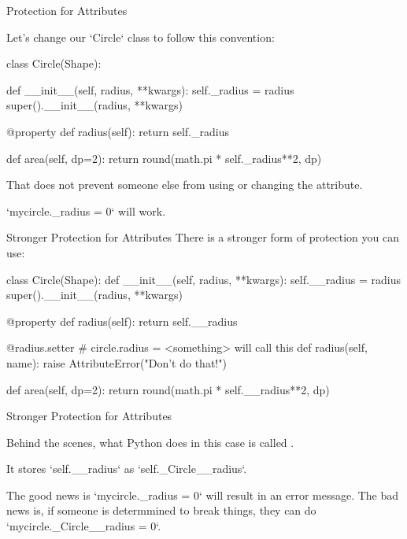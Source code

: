 \documentclass[aspectratio=149] {beamer}
\begin{document}
\begin{frame}[fragile]{Protection for Attributes}
  
   \small
  Let's change our \inline`Circle` class to follow this convention:
 
  \begin{pythoncode}
    class Circle(Shape):

        def __init__(self, radius, **kwargs):
            self._radius = radius
            super().__init__(radius, **kwargs)

        @property
        def radius(self):
            return self._radius

        def area(self, dp=2):
            return round(math.pi * self._radius**2, dp)
  \end{pythoncode}

  That does not prevent someone else from using or changing the attribute.
  
  \inline`mycircle._radius = 0` will work.
  
\end{frame}


\begin{frame}[fragile]{Stronger Protection for Attributes}
  \small
  There is a stronger form of protection you can use:
  
  \begin{pythoncode}
    class Circle(Shape):
        def __init__(self, radius, **kwargs):
            self.__radius = radius
            super().__init__(radius, **kwargs)

        @property
        def radius(self):
            return self.__radius

        @radius.setter # circle.radius = <something>  will call this 
        def radius(self, name):
            raise AttributeError("Don't do that!")

        def area(self, dp=2):
            return round(math.pi * self.__radius**2, dp)
  \end{pythoncode}
\end{frame}

\begin{frame}[fragile]{Stronger Protection for Attributes}
  
  Behind the scenes, what Python does in this case is called
  .
  
  \bigskip
  
  It stores \inline`self.__radius` as \inline`self._Circle__radius`.

  \bigskip \pause
  
  The good news is \inline`mycircle._radius = 0` will result in an error message.
  The bad news is, if someone is determmined to break things, 
  they can do \inline`mycircle._Circle__radius = 0`.
  
  
\end{frame}
\end{document}
